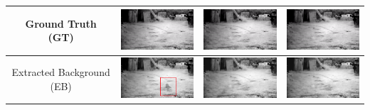 \documentclass[11pt]{scrartcl} %
\theoremstyle{plain}
\begin{document}
\begin{minipage}{\linewidth}
\begin{tabular}{ | c | m{2.8cm} | m{2.8cm} | m{2.8cm} | }
	Ground Truth (GT)
	&
    \begin{minipage}{.3\textwidth}
      \includegraphics[width=\linewidth, width=25mm]{figures_video/crow/background.png}
    \end{minipage}
	&
    \begin{minipage}{.3\textwidth}
      \includegraphics[width=\linewidth, width=25mm]{figures_video/crow/background.png}
    \end{minipage}
    &
    \begin{minipage}{.3\textwidth}
      \includegraphics[width=\linewidth, width=25mm]{figures_video/crow/background.png}
    \end{minipage}
	\\ \hline
	
	Extracted Background (EB)
	&
    \begin{minipage}{.3\textwidth}
      \includegraphics[width=\linewidth, width=25mm]{figures_video/crow/rpca/lowRank_0_06.png}
    \end{minipage}	
	&
    \begin{minipage}{.3\textwidth}
      \includegraphics[width=\linewidth, width=25mm]{figures_video/crow/pca/lowRank_0.png}
    \end{minipage}
	&
    \begin{minipage}{.3\textwidth}
      \includegraphics[width=\linewidth, width=25mm]{figures_video/crow/pca2/lowRank_0.png}
    \end{minipage}
	\\ \hline
	

\end{tabular}
\end{minipage}
\end{document}
